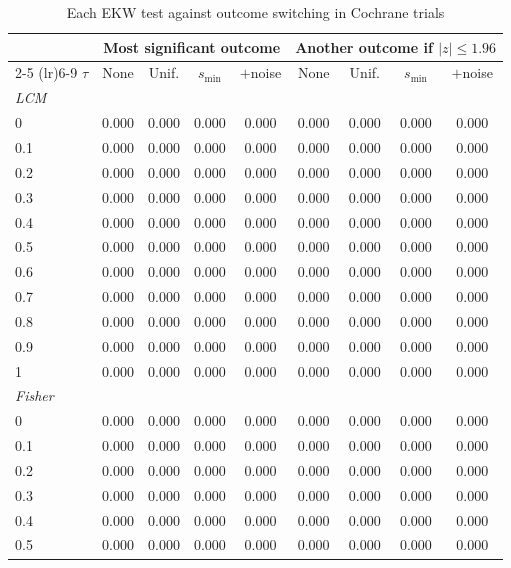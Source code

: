 \begin{table}[htbp]
\centering
\caption{Each EKW test against outcome switching in Cochrane trials}
\label{tab:cochrane_switching_power_desktop_EKW}
\footnotesize
\setlength{\tabcolsep}{4pt}
\begin{tabular}{lcccccccc}
\toprule
 & \multicolumn{4}{c}{Most significant outcome} & \multicolumn{4}{c}{Another outcome if $|z| \le 1.96$} \\
\cmidrule(lr){2-5} \cmidrule(lr){6-9}
$\tau$ & None & Unif. & $s_{\min}$ & $+$noise & None & Unif. & $s_{\min}$ & $+$noise \\
\midrule
\multicolumn{9}{l}{\textit{LCM}} \\
0 & 0.000 & 0.000 & 0.000 & 0.000 & 0.000 & 0.000 & 0.000 & 0.000 \\
0.1 & 0.000 & 0.000 & 0.000 & 0.000 & 0.000 & 0.000 & 0.000 & 0.000 \\
0.2 & 0.000 & 0.000 & 0.000 & 0.000 & 0.000 & 0.000 & 0.000 & 0.000 \\
0.3 & 0.000 & 0.000 & 0.000 & 0.000 & 0.000 & 0.000 & 0.000 & 0.000 \\
0.4 & 0.000 & 0.000 & 0.000 & 0.000 & 0.000 & 0.000 & 0.000 & 0.000 \\
0.5 & 0.000 & 0.000 & 0.000 & 0.000 & 0.000 & 0.000 & 0.000 & 0.000 \\
0.6 & 0.000 & 0.000 & 0.000 & 0.000 & 0.000 & 0.000 & 0.000 & 0.000 \\
0.7 & 0.000 & 0.000 & 0.000 & 0.000 & 0.000 & 0.000 & 0.000 & 0.000 \\
0.8 & 0.000 & 0.000 & 0.000 & 0.000 & 0.000 & 0.000 & 0.000 & 0.000 \\
0.9 & 0.000 & 0.000 & 0.000 & 0.000 & 0.000 & 0.000 & 0.000 & 0.000 \\
1 & 0.000 & 0.000 & 0.000 & 0.000 & 0.000 & 0.000 & 0.000 & 0.000 \\
\midrule
\multicolumn{9}{l}{\textit{Fisher}} \\
0 & 0.000 & 0.000 & 0.000 & 0.000 & 0.000 & 0.000 & 0.000 & 0.000 \\
0.1 & 0.000 & 0.000 & 0.000 & 0.000 & 0.000 & 0.000 & 0.000 & 0.000 \\
0.2 & 0.000 & 0.000 & 0.000 & 0.000 & 0.000 & 0.000 & 0.000 & 0.000 \\
0.3 & 0.000 & 0.000 & 0.000 & 0.000 & 0.000 & 0.000 & 0.000 & 0.000 \\
0.4 & 0.000 & 0.000 & 0.000 & 0.000 & 0.000 & 0.000 & 0.000 & 0.000 \\
0.5 & 0.000 & 0.000 & 0.000 & 0.000 & 0.000 & 0.000 & 0.000 & 0.000 \\

\end{tabular}
\end{table}
